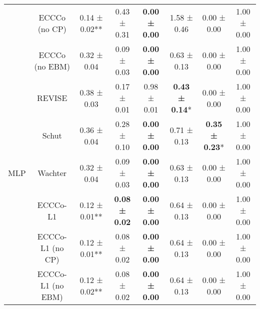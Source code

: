 \begin{table}
{\begin{tabular}[t]{cccccccc}
 & ECCCo (no CP) & 0.14 ± 0.02** & 0.43 ± 0.31\hphantom{*}\hphantom{*} & \textbf{0.00 ± 0.00}\hphantom{*}\hphantom{*} & 1.58 ± 0.46\hphantom{*}\hphantom{*} & 0.00 ± 0.00\hphantom{*}\hphantom{*} & 1.00 ± 0.00\hphantom{*}\hphantom{*}\\

 & ECCCo (no EBM) & 0.32 ± 0.04\hphantom{*}\hphantom{*} & 0.09 ± 0.03\hphantom{*}\hphantom{*} & \textbf{0.00 ± 0.00}\hphantom{*}\hphantom{*} & 0.63 ± 0.13\hphantom{*}\hphantom{*} & 0.00 ± 0.00\hphantom{*}\hphantom{*} & 1.00 ± 0.00\hphantom{*}\hphantom{*}\\

 & REVISE & 0.38 ± 0.03\hphantom{*}\hphantom{*} & 0.17 ± 0.01\hphantom{*}\hphantom{*} & 0.98 ± 0.01\hphantom{*}\hphantom{*} & \textbf{0.43 ± 0.14}*\hphantom{*} & 0.00 ± 0.00\hphantom{*}\hphantom{*} & 1.00 ± 0.00\hphantom{*}\hphantom{*}\\

 & Schut & 0.36 ± 0.04\hphantom{*}\hphantom{*} & 0.28 ± 0.10\hphantom{*}\hphantom{*} & \textbf{0.00 ± 0.00}\hphantom{*}\hphantom{*} & 0.71 ± 0.13\hphantom{*}\hphantom{*} & \textbf{0.35 ± 0.23}*\hphantom{*} & 1.00 ± 0.00\hphantom{*}\hphantom{*}\\

\multirow[t]{-9}{*}{\centering\arraybackslash MLP} & Wachter & 0.32 ± 0.04\hphantom{*}\hphantom{*} & 0.09 ± 0.03\hphantom{*}\hphantom{*} & \textbf{0.00 ± 0.00}\hphantom{*}\hphantom{*} & 0.63 ± 0.13\hphantom{*}\hphantom{*} & 0.00 ± 0.00\hphantom{*}\hphantom{*} & 1.00 ± 0.00\hphantom{*}\hphantom{*}\\
\cmidrule{1-8}
 & ECCCo-L1 & 0.12 ± 0.01** & \textbf{0.08 ± 0.02}\hphantom{*}\hphantom{*} & \textbf{0.00 ± 0.00}\hphantom{*}\hphantom{*} & 0.64 ± 0.13\hphantom{*}\hphantom{*} & 0.00 ± 0.00\hphantom{*}\hphantom{*} & 1.00 ± 0.00\hphantom{*}\hphantom{*}\\

 & ECCCo-L1 (no CP) & 0.12 ± 0.01** & 0.08 ± 0.02\hphantom{*}\hphantom{*} & \textbf{0.00 ± 0.00}\hphantom{*}\hphantom{*} & 0.64 ± 0.13\hphantom{*}\hphantom{*} & 0.00 ± 0.00\hphantom{*}\hphantom{*} & 1.00 ± 0.00\hphantom{*}\hphantom{*}\\

 & ECCCo-L1 (no EBM) & 0.12 ± 0.02** & 0.08 ± 0.02\hphantom{*}\hphantom{*} & \textbf{0.00 ± 0.00}\hphantom{*}\hphantom{*} & 0.64 ± 0.13\hphantom{*}\hphantom{*} & 0.00 ± 0.00\hphantom{*}\hphantom{*} & 1.00 ± 0.00\hphantom{*}\hphantom{*}\\


\end{tabular}}
\end{table}
